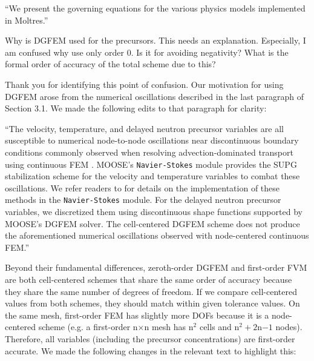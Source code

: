 \documentclass[answers,12pt]{exam}
\begin{document}
\begin{questions}
\begin{solution}
        	``We present the governing equations for the various physics models
        	implemented in Moltres.''
        \end{solution}

        \question Why is DGFEM used for the precursors. This needs an
        explanation. Especially, I am confused why use only order 0. Is it for
        avoiding negativity? What is the formal order of
        accuracy of the total scheme due to this?
        \begin{solution}
        	Thank you for identifying this point of confusion.
        	Our motivation for using DGFEM
        	arose from the numerical oscillations described in the last
        	paragraph of Section 3.1. We made the following edits to that
        	paragraph for clarity:
        	
        	``The velocity, temperature, and delayed neutron precursor variables are all susceptible to numerical node-to-node oscillations near discontinuous boundary conditions commonly observed when resolving advection-dominated transport using continuous FEM \cite{kuhlmann_lid-driven_2018}. MOOSE's \texttt{Navier-Stokes} module provides the SUPG stabilization scheme \cite{brooks_streamline_1982} for the velocity and temperature variables to combat these oscillations. We refer readers to \cite{peterson_overview_2018} for details on the implementation of these methods in the \texttt{Navier-Stokes} module. For the delayed neutron precursor variables, we discretized them using discontinuous shape functions supported by MOOSE's DGFEM solver. The cell-centered DGFEM scheme does not produce the aforementioned numerical oscillations observed with node-centered continuous FEM.''
        	
        	Beyond their fundamental differences, zeroth-order DGFEM and
            first-order FVM are both cell-centered schemes that share the
            same order of accuracy because they share the
            same number of degrees of freedom. If we compare cell-centered
            values from both schemes, they should match within given
            tolerance values. On the same mesh, first-order
            FEM has slightly more DOFs because it is a node-centered scheme
            (e.g. a first-order n$\times$n mesh has n$^2$ cells and
            n$^2+2$n$-1$ nodes).
            Therefore, all variables (including the precursor concentrations)
            are first-order accurate. We made the following changes in the
            relevant text to highlight this:
            

\end{solution}
\end{questions}
\end{document}
